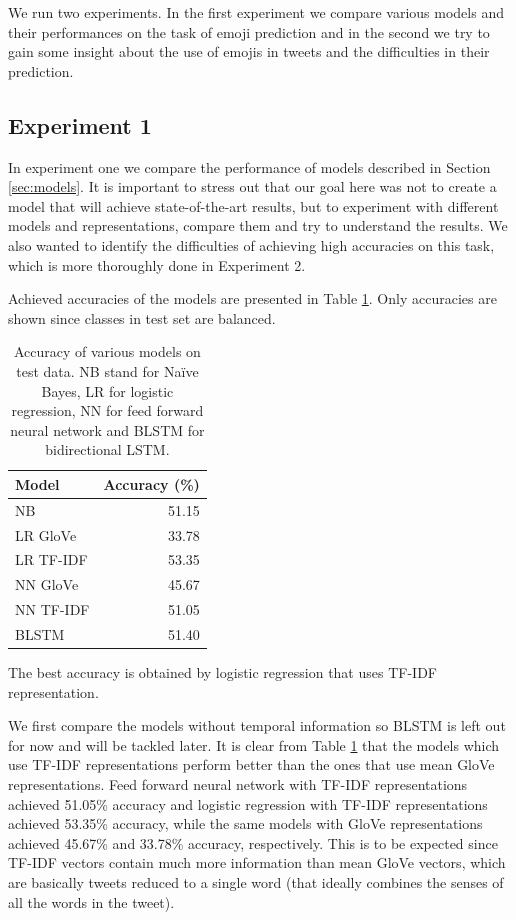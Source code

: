 \documentclass[10pt, a4paper]{article}
\begin{document}
We run two experiments. In the first experiment we compare various models and 
their performances on the task of emoji prediction and in the second we try to 
gain some insight about the use of emojis in tweets and the difficulties in 
their prediction.

\subsection{Experiment 1}

In experiment one we compare the performance of models described in Section 
\ref{sec:models}. It is important to stress out that our goal here was not to 
create a model that will achieve state-of-the-art results, but to experiment 
with different models and representations, compare them and try to understand 
the results. We also wanted to identify the difficulties of achieving high 
accuracies on this task, which is more thoroughly done in Experiment 2.

Achieved accuracies of the models are presented in Table 
\ref{tab:accuracy}. Only accuracies are shown since classes in test set are 
balanced.

\begin{table}
\caption{Accuracy of various models on test data. NB stand for Na\"ive Bayes, LR
for logistic regression, NN for feed forward neural network and BLSTM for 
bidirectional LSTM.}
\label{tab:accuracy}
\begin{center}
\begin{tabular}{lr}
\toprule
Model & Accuracy (\%) \\
\midrule
NB        & 51.15 \\
LR GloVe  & 33.78 \\
LR TF-IDF & 53.35 \\
NN GloVe  & 45.67 \\
NN TF-IDF & 51.05 \\
BLSTM     & 51.40 \\
\bottomrule
\end{tabular}
\end{center}
\end{table}

The best accuracy is obtained by logistic regression that uses TF-IDF 
representation.

We first compare the models without temporal information so BLSTM is left out 
for now and will be tackled later. It is clear from Table \ref{tab:accuracy} 
that the models which use TF-IDF representations perform better than the ones 
that use mean GloVe representations. Feed forward neural network with TF-IDF 
representations achieved 51.05\% accuracy and logistic regression with TF-IDF 
representations achieved 53.35\% accuracy, while the same models with GloVe 
representations achieved 45.67\% and 33.78\% accuracy, respectively. This is to 
be expected since TF-IDF vectors contain much more information than mean GloVe 
vectors, which are basically tweets reduced to a single word (that ideally
combines the senses of all the words in the tweet).
\end{document}
